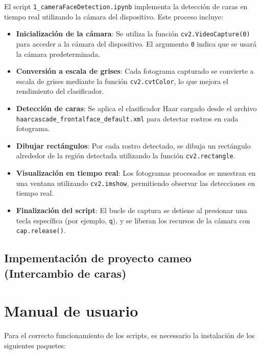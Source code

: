 \documentclass[a4paper]{article}
\begin{document}
El script \texttt{1\_cameraFaceDetection.ipynb} implementa la detección de caras en tiempo real utilizando la cámara del dispositivo. Este proceso incluye:

\begin{itemize}
    \item \textbf{Inicialización de la cámara}: Se utiliza la función \texttt{cv2.VideoCapture(0)} para acceder a la cámara del dispositivo. El argumento \texttt{0} indica que se usará la cámara predeterminada.
    \item \textbf{Conversión a escala de grises}: Cada fotograma capturado se convierte a escala de grises mediante la función \texttt{cv2.cvtColor}, lo que mejora el rendimiento del clasificador.
    \item \textbf{Detección de caras}: Se aplica el clasificador Haar cargado desde el archivo \texttt{haarcascade\_frontalface\_default.xml} para detectar rostros en cada fotograma.
    \item \textbf{Dibujar rectángulos}: Por cada rostro detectado, se dibuja un rectángulo alrededor de la región detectada utilizando la función \texttt{cv2.rectangle}.
    \item \textbf{Visualización en tiempo real}: Los fotogramas procesados se muestran en una ventana utilizando \texttt{cv2.imshow}, permitiendo observar las detecciones en tiempo real.
    \item \textbf{Finalización del script}: El bucle de captura se detiene al presionar una tecla específica (por ejemplo, \texttt{q}), y se liberan los recursos de la cámara con \texttt{cap.release()}.
\end{itemize}


\subsection{Impementación de proyecto cameo (Intercambio de caras)}

\section{Manual de usuario}

Para el correcto funcionamiento de los scripts, es necessario la instalación de los siguientes paquetes:
\end{document}
